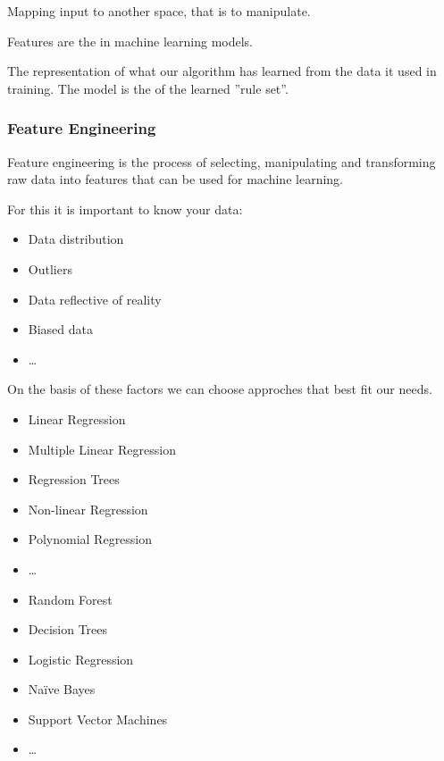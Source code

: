 \documentclass[
../EiKI_Summary.tex,
]
{subfiles}
\begin{document}
\begin{defbox}
    [Representation]
    Mapping input to another space, that is  to manipulate.
\end{defbox}

\begin{defbox}
    [Feature]
    Features are the  in machine learning models.
\end{defbox}

\begin{defbox}
    [Model]
    The representation of what our algorithm has learned from the data it used in training. The model is the  of the learned ''rule set''.
\end{defbox}

\subsubsection{Feature Engineering}
Feature engineering is the process of selecting, manipulating and transforming raw data into features that can be used for machine learning.

For this it is important to know your data:
\begin{itemize}
    \item Data distribution
    \item Outliers
    \item Data reflective of reality
    \item Biased data
    \item \dots
\end{itemize}

On the basis of these factors we can choose approches that best fit our needs.

\begin{minipage}
    [t]{0.5\textwidth}
    \begin{itemize}
        \item Linear Regression
        \item Multiple Linear Regression
        \item Regression Trees
        \item Non-linear Regression
        \item Polynomial Regression
        \item \dots
    \end{itemize}
\end{minipage}
\begin{minipage}
    [t]{0.5\textwidth}
    \begin{itemize}
        \item Random Forest
        \item Decision Trees
        \item Logistic Regression
        \item Na\"ive Bayes
        \item Support Vector Machines
        \item \dots
    \end{itemize}
\end{minipage}
\end{document}
